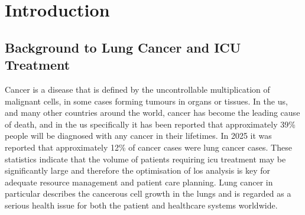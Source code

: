 \documentclass[11pt]{article}
\newcounter{savepage}
\begin{document}
\newpage

\renewcommand{\abstractname}{Acknowledgements}

\begin{abstract}
 
I would like to express my appreciation to Vaish Balaji, Orlagh Carroll and Ananya Malhotra for providing me with the invaluable expertise and guidance that I have utilised throughout my MSc project and will continue to benefit from in my future endeavours. Another thank you to Jonathan Wong for providing me with the initial concept that formed the objective for this project. 

I am grateful for the work that was put into the collection and composition of the open access \gls{mimic}-IV database, which aided my study massively.

I would also like to thank the programme supervisors, Stephane Hue, Damien Tully an Keith Tomlin, and to all of the professors that taught me throughout the duration of this MSc.

Finally, I would like to thank my family and friends for their immense support throughout the duration of completing this project and MSc course.
\end{abstract}

\newpage

\tableofcontents
\pagebreak


  \listoffigures
  \cleardoublepage
 
  \listoftables

\cleardoublepage

\clearpage

\printnoidxglossary[type=\acronymtype, title={List of Abbreviations}]

\clearpage


\newpage

\setcounter{savepage}{\value{page}}
\section{Introduction}

\subsection{Background to Lung Cancer and ICU Treatment}
Cancer is a disease that is defined by the uncontrollable multiplication of malignant cells, in some cases forming tumours in organs or tissues. In the \gls{us}, and many other countries around the world, cancer has become the leading cause of death, and in the \gls{us} specifically it has been reported that approximately 39\% people will be diagnosed with any cancer in their lifetimes\cite{cancerCancerSite}. In 2025 it was reported that approximately 12\% of cancer cases were lung cancer cases\cite{cancer}. These statistics indicate that the volume of patients requiring \gls{icu} treatment may be significantly large and therefore the optimisation of \gls{los} analysis is key for adequate resource management and patient care planning. Lung cancer in particular describes the cancerous cell growth in the lungs and is regarded as a serious health issue for both the patient and healthcare systems worldwide.
\end{document}
